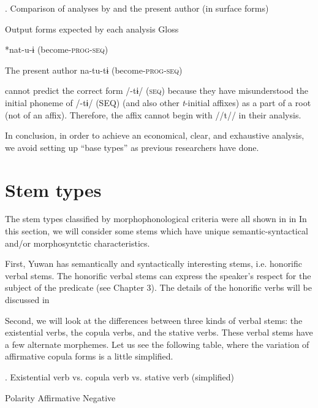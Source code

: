 \begin{styleBeschriftung}
\textmd{. Comparison of analyses by \citet{UchimaEtAl1976} and the present author (in surface forms)}
\end{styleBeschriftung}

  Output forms expected by each analysis  Gloss

\citet{UchimaEtAl1976}  *nat-u-ɨ  (become-\textsc{prog}-\textsc{seq})

The present author  na-tu-tɨ  (become-\textsc{prog}-\textsc{seq})

\citet{UchimaEtAl1976} cannot predict the correct form /-tɨ/ (\textsc{seq}) because they have misunderstood the initial phoneme of /-tɨ/ (SEQ) (and also other \textit{t}{}-initial affixes) as a part of a root (not of an affix). Therefore, the affix cannot begin with //t// in their analysis.

  In conclusion, in order to achieve an economical, clear, and exhaustive analysis, we avoid setting up “base types” as previous researchers have done.

\section{Stem types}

The stem types classified by morphophonological criteria were all shown in  in  In this section, we will consider some stems which have unique semantic-syntactical and/or morphosyntctic characteristics.

  First, Yuwan has semantically and syntactically interesting stems, i.e. honorific verbal stems. The honorific verbal stems can express the speaker’s respect for the subject of the predicate (see Chapter 3). The details of the honorific verbs will be discussed in 

  Second, we will look at the differences between three kinds of verbal stems: the existential verbs, the copula verbs, and the stative verbs. These verbal stems have a few alternate morphemes. Let us see the following table, where the variation of affirmative copula forms is a little simplified.

\begin{styleBeschriftung}
\textmd{}\textmd{. Existential verb vs. copula verb vs. stative verb (simplified)}
\end{styleBeschriftung}

Polarity  Affirmative  Negative

